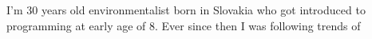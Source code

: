 
\begin{cventries}
  \cventry
    {} %
    {} %
    {} %
    {} %
    {
      I'm 30 years old environmentalist born in Slovakia who got introduced to programming at early age of 8. Ever since then I was following trends of  
    }
    
    
\end{cventries}
